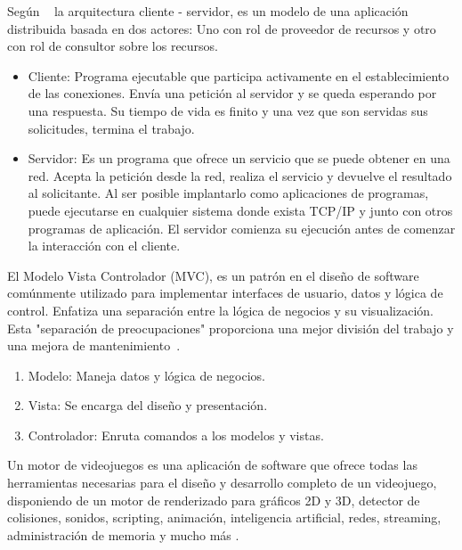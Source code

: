 
Según ~\cite{moyano2020arquitectura} la arquitectura cliente - servidor, es un modelo de una aplicación distribuida basada en dos actores: Uno con rol de proveedor de recursos y otro con rol de consultor sobre los recursos.
\begin{itemize}
    \item Cliente: Programa ejecutable que participa activamente en el establecimiento de las conexiones. Envía una petición al servidor y se queda esperando por una respuesta. Su tiempo de vida es finito y una vez que son servidas sus solicitudes, termina el trabajo.
    \item Servidor: Es un programa que ofrece un servicio que se puede obtener en una red. Acepta la petición desde la red, realiza el servicio y devuelve el resultado al solicitante. Al ser posible implantarlo como aplicaciones de programas, puede ejecutarse en cualquier sistema donde exista TCP/IP y junto con otros programas de aplicación. El servidor comienza su ejecución antes de comenzar la interacción con el cliente.
\end{itemize}

 El Modelo Vista Controlador (MVC), es un patrón en el diseño de software comúnmente utilizado para implementar interfaces de usuario, datos y lógica de control. Enfatiza una separación entre la lógica de negocios y su visualización. Esta "separación de preocupaciones" proporciona una mejor división del trabajo y una mejora de mantenimiento~\cite{MVCGlosa42}. 
\begin{enumerate}
    \item Modelo: Maneja datos y lógica de negocios.
    \item Vista: Se encarga del diseño y presentación.
    \item Controlador: Enruta comandos a los modelos y vistas.
\end{enumerate}

Un motor de videojuegos es una aplicación de software que ofrece todas las herramientas necesarias para el diseño y desarrollo completo de un videojuego, disponiendo de un motor de renderizado para gráficos 2D y 3D, detector de colisiones, sonidos, scripting, animación, inteligencia artificial, redes, streaming, administración de memoria y mucho más \cite{arce2011desarrollo}.

